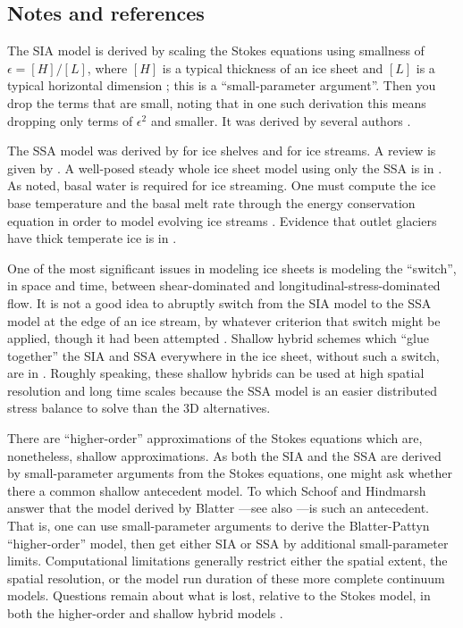 \documentclass[titlepage,letterpaper,final,12pt]{scrartcl}
\newcommand{\eps}{\epsilon}
\begin{document}
\subsection{Notes and references} \label{sec:nr}

The SIA model is derived by scaling the Stokes equations using smallness of $\eps = [H]/[L]$, where $[H]$ is a typical thickness of an ice sheet and $[L]$ is a typical horizontal dimension \cite{Fowler}; this is a ``small-parameter argument''.  Then you drop the terms that are small, noting that in one such derivation this means dropping only terms of $\eps^2$ and smaller.  It was derived by several authors \cite{FowlerLarson1978,MorlandJohnson,Hutter}.  

The SSA model was derived by \cite{Morland} for ice shelves and \cite{MacAyeal} for ice streams.  A review is given by \cite{WeisGreveHutter}.  A well-posed steady whole ice sheet model using only the SSA is in \cite{SchoofStream}.  As noted, basal water is required for ice streaming.  One must compute the ice base temperature and the basal melt rate through the energy conservation equation in order to model evolving ice streams \cite{Clarke05,Raymondenergy}.  Evidence that outlet glaciers have thick temperate ice is in \cite{Luethietal2009}.

One of the most significant issues in modeling ice sheets is modeling the ``switch'', in space and time, between shear-dominated and longitudinal-stress-dominated flow.  It is not a good idea to abruptly switch from the SIA model to the SSA model at the edge of an ice stream, by whatever criterion that switch might be applied, though it had been attempted \cite{HulbeMacAyeal,Ritzetal2001}.  Shallow hybrid schemes which ``glue together'' the SIA and SSA everywhere in the ice sheet, without such a switch, are in \cite{PollardDeConto,BBssasliding,Goldberg2011}.  Roughly speaking, these shallow hybrids can be used at high spatial resolution and long time scales because the SSA model is an easier distributed stress balance to solve than the 3D alternatives.

There are ``higher-order'' approximations of the Stokes equations which are, nonetheless, shallow approximations.  As both the SIA and the SSA are derived by small-parameter arguments from the Stokes equations, one might ask whether there a common shallow antecedent model.  To which Schoof and Hindmarsh \cite{SchoofHindmarsh} answer that the model derived by Blatter \cite{Blatter}---see also \cite{Pattyn03}---is such an antecedent.  That is, one can use small-parameter arguments to derive the Blatter-Pattyn ``higher-order'' model, then get either SIA or SSA by additional small-parameter limits.  Computational limitations generally restrict either the spatial extent, the spatial resolution, or the model run duration of these more complete continuum models.  Questions remain about what is lost, relative to the Stokes model, in both the higher-order and shallow hybrid models \cite[for example]{ISMIPHOM}.
\end{document}
